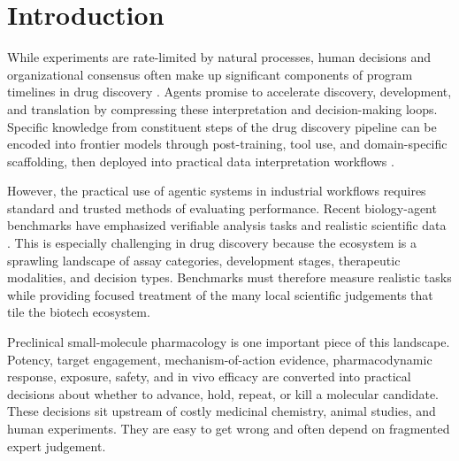 \documentclass[10pt,letterpaper]{article}
\begin{document}
{\fontsize{8.85}{12.0}\selectfont
\newcommand{\TwoColParaBreak}{\par\vspace{0.62em}\noindent}
\noindent\begin{minipage}[t]{0.47\textwidth}
\setlength{\parskip}{0pt}
\setlength{\parindent}{0pt}

\section{Introduction}

While experiments are rate-limited by natural processes, human decisions and
organizational consensus often make up significant components of program
timelines in drug discovery \cite{scannell2012,kola2004,cook2014,hughes2011}.
Agents promise to accelerate discovery, development, and translation by
compressing these interpretation and decision-making loops.  Specific knowledge
from constituent steps of the drug discovery pipeline can be encoded into
frontier models through post-training, tool use, and domain-specific
scaffolding, then deployed into practical data interpretation workflows
\cite{tuntland2014,vamathevan2019,hasselgren2024}.

\TwoColParaBreak However, the practical use of agentic systems in industrial
workflows requires standard and trusted methods of evaluating performance.
Recent biology-agent benchmarks have emphasized verifiable analysis tasks and
realistic scientific data
\cite{spatialbenchlong2026,spatialbench2025,scbench2026,labbench2024,bixbench2025,biomnibench2026,genebench2026}.
This is especially challenging in drug discovery because the ecosystem is a
sprawling landscape of assay categories, development stages, therapeutic
modalities, and decision types. Benchmarks must therefore measure realistic
tasks while providing focused treatment of the many local scientific judgements
that tile the biotech ecosystem.

\TwoColParaBreak

Preclinical small-molecule pharmacology is one important piece of this
landscape. Potency, target engagement, mechanism-of-action evidence,
pharmacodynamic response, exposure, safety, and in vivo efficacy are converted
into practical decisions about whether to advance, hold, repeat, or kill a
molecular candidate. These decisions sit upstream of costly medicinal
chemistry, animal studies, and human experiments. They are easy to get wrong
and often depend on fragmented expert judgement.


\end{minipage}}
\end{document}
